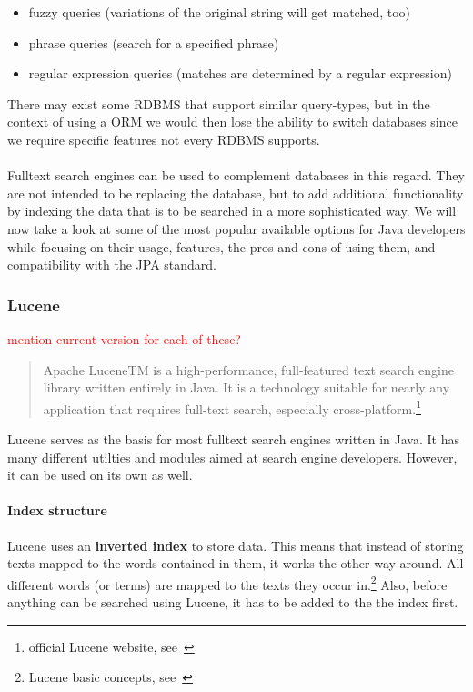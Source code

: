 \begin{itemize}
	\item fuzzy queries (variations of the original string will get matched, too)
	\item phrase queries (search for a specified phrase)
	\item regular expression queries (matches are determined by a regular expression)
\end{itemize}
There may exist some RDBMS that support similar query-types, but in the context of using a ORM we would then lose the ability to switch databases since we require specific features not every RDBMS supports.
\\\\
Fulltext search engines can be used to complement databases in this regard. They are not intended to be replacing the database, but to add additional functionality by indexing the data that is to be searched in a more sophisticated way. We will now take a look at some of the most popular available options for Java developers while focusing on their usage, features, the pros and cons of using them, and compatibility with the JPA standard.

\subsubsection{Lucene}

\textcolor{red}{mention current version for each of these?}

\begin{quote}
Apache LuceneTM is a high-performance, full-featured text search engine library written entirely in Java. It is a technology suitable for nearly any application that requires full-text search, especially cross-platform.\footnote{official Lucene website, see~\cite{lucene_apache_org}}
\end{quote}
Lucene serves as the basis for most fulltext search engines written in Java. It has many different utilties and modules aimed at search engine developers. However, it can be used on its own as well.

\paragraph{Index structure}
Lucene uses an \textbf{inverted index} to store data. This means that instead of storing texts mapped to the words contained in them, it works the other way around. All different words (or terms) are mapped to the texts they occur in.\footnote{Lucene basic concepts, see~\cite{lucene_basic_concepts}} Also, before anything can be searched using Lucene, it has to be added to the the index first.

